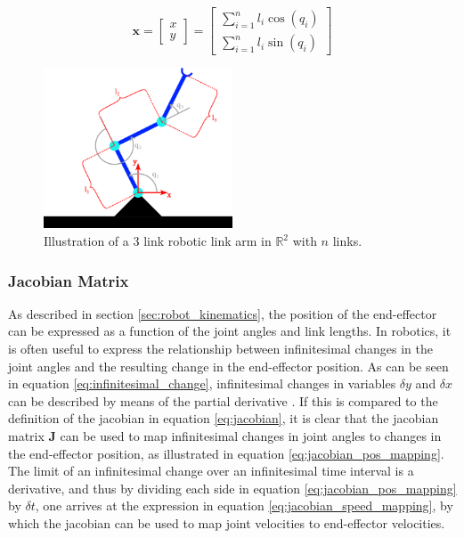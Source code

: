 \begin{equation}
    \label{eq:robot_kinematics}
    \mathbf{x} = \begin{bmatrix}
        x \\
        y
    \end{bmatrix} = \begin{bmatrix}
        \sum_{i=1}^{n} l_i \cos(q_i) \\
        \sum_{i=1}^{n} l_i \sin(q_i)
    \end{bmatrix}
\end{equation}

\begin{figure}[H]
    \centering
    \includegraphics[width=0.5\textwidth]{Images/manipulator_inkscape_Layer 1.png}
    \caption{Illustration of a 3 link robotic link arm in $\mathbb{R}^2$ with $n$ links.}
    \label{fig:robotic_link_arm}
\end{figure}


    \subsubsection{Jacobian Matrix}

As described in section \ref{sec:robot_kinematics}, the position of the end-effector can be expressed as a function of the joint angles and link lengths. In robotics, it is often useful to express the relationship between infinitesimal changes in the joint angles and the resulting change in the end-effector position. As can be seen in equation \ref{eq:infinitesimal_change}, infinitesimal changes in variables $\delta y$ and $\delta x$ can be described by means of the partial derivative \cite{modsim}. If this is compared to the definition of the jacobian in equation \ref{eq:jacobian}, it is clear that the jacobian matrix $\mathbf{J}$ can be used to map infinitesimal changes in joint angles to changes in the end-effector position, as illustrated in equation \ref{eq:jacobian_pos_mapping}. The limit of an infinitesimal change over an infinitesimal time interval is a derivative, and thus by dividing each side in equation \ref{eq:jacobian_pos_mapping} by $\delta t$, one arrives at the expression in equation \ref{eq:jacobian_speed_mapping}, by which the jacobian can be used to map joint velocities to end-effector velocities.

